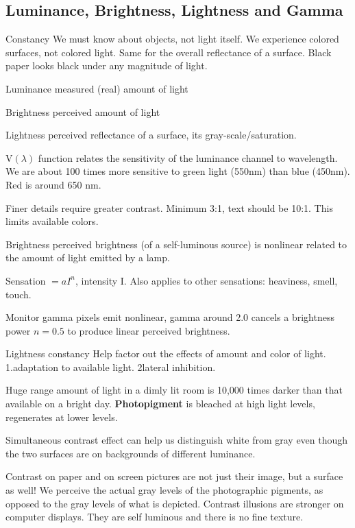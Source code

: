 \begin{mdframed}\begin{multicols}{2}
\subsection{Luminance, Brightness, Lightness and Gamma}
\begin{compactdesc}
    \item[Constancy] We must know about objects, not light itself. We
        experience colored surfaces, not colored light. Same for the
        overall reflectance of a surface. Black paper looks black under any
        magnitude of light.
    \item[Luminance] measured (real) amount of light
    \item[Brightness] perceived amount of light
    \item[Lightness] perceived reflectance of a surface, its
        gray-scale/saturation.

    \item[V$(\lambda)$ function] relates the sensitivity of the luminance
        channel to wavelength. We are about 100 times more sensitive to
        green light (550nm) than blue (450nm). Red is around 650 nm.
    \item[Finer details] require greater contrast. Minimum 3:1, text should be
        10:1. This limits available colors.
    \item[Brightness] perceived brightness (of a self-luminous source) is
        nonlinear related to the amount of light emitted by a lamp.
    \item[Sensation] $= aI^n$, intensity I. Also applies to other sensations:
        heaviness, smell, touch.
    \item[Monitor gamma] pixels emit nonlinear, gamma around 2.0 cancels a
        brightness power $n = 0.5$ to produce linear perceived brightness.
    \item[Lightness constancy] Help factor out the effects of amount and color
        of light. 1.\@ adaptation to available light. 2\@ lateral inhibition.
    \item[Huge range] amount of light in a dimly lit room is 10,000 times
        darker than that available on a bright day. \textbf{Photopigment} is
        bleached at high light levels, regenerates at lower levels.
    \item[Simultaneous contrast effect] can help us distinguish white from gray
        even though the two surfaces are on backgrounds of different luminance.
    \item[Contrast on paper and on screen] pictures are not just their image,
        but a surface as well! We perceive the actual gray levels of the
        photographic pigments, as opposed to the gray levels of what is depicted.
        Contrast illusions are stronger on computer displays. They are self
        luminous and there is no fine texture.
\end{compactdesc}
\end{multicols}\end{mdframed}

